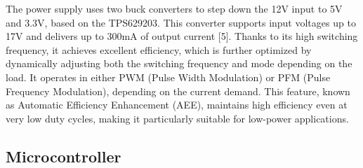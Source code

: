 
The power supply uses two buck converters to step down the 12V input to 5V and 3.3V, based on the TPS629203.
 This converter supports input voltages up to 17V and delivers up to 300mA of output current [5].
 Thanks to its high switching frequency, it achieves excellent efficiency, which is further optimized by dynamically adjusting both the switching frequency and mode depending on the load. It operates in either PWM (Pulse Width Modulation) or PFM (Pulse Frequency Modulation), depending on the current demand. This feature, known as Automatic Efficiency Enhancement (AEE), maintains high efficiency even at very low duty cycles, making it particularly suitable for low-power applications.\\

\subsection{Microcontroller}


